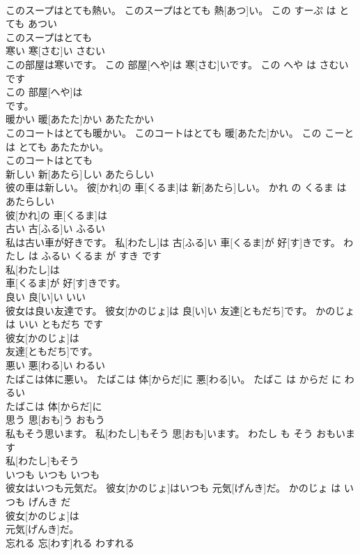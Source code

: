 \documentclass[8pt]{extreport}
\begin{document}
\begin{CJK}{UTF8}{min}
\\	このスープはとても熱い。	このスープはとても 熱[あつ]い。	この すーぷ は とても あつい	
\\	このスープはとても
\\	寒い	寒[さむ]い	さむい	
\\	この部屋は寒いです。	この 部屋[へや]は 寒[さむ]いです。	この へや は さむい です	
\\	この 部屋[へや]は
\\	です。			
\\	暖かい	暖[あたた]かい	あたたかい	
\\	このコートはとても暖かい。	このコートはとても 暖[あたた]かい。	この こーと は とても あたたかい。	
\\	このコートはとても
\\	新しい	新[あたら]しい	あたらしい	
\\	彼の車は新しい。	彼[かれ]の 車[くるま]は 新[あたら]しい。	かれ の くるま は あたらしい	
\\	彼[かれ]の 車[くるま]は
\\	古い	古[ふる]い	ふるい	
\\	私は古い車が好きです。	私[わたし]は 古[ふる]い 車[くるま]が 好[す]きです。	わたし は ふるい くるま が すき です	
\\	私[わたし]は
\\	車[くるま]が 好[す]きです。			
\\	良い	良[い]い	いい	
\\	彼女は良い友達です。	彼女[かのじょ]は 良[い]い 友達[ともだち]です。	かのじょ は いい ともだち です	
\\	彼女[かのじょ]は
\\	友達[ともだち]です。			
\\	悪い	悪[わる]い	わるい	
\\	たばこは体に悪い。	たばこは 体[からだ]に 悪[わる]い。	たばこ は からだ に わるい	
\\	たばこは 体[からだ]に
\\	思う	思[おも]う	おもう	
\\	私もそう思います。	私[わたし]もそう 思[おも]います。	わたし も そう おもいます	
\\	私[わたし]もそう
\\	いつも	いつも	いつも	
\\	彼女はいつも元気だ。	彼女[かのじょ]はいつも 元気[げんき]だ。	かのじょ は いつも げんき だ	
\\	彼女[かのじょ]は
\\	元気[げんき]だ。			
\\	忘れる	忘[わす]れる	わすれる	

\end{CJK}
\end{document}
